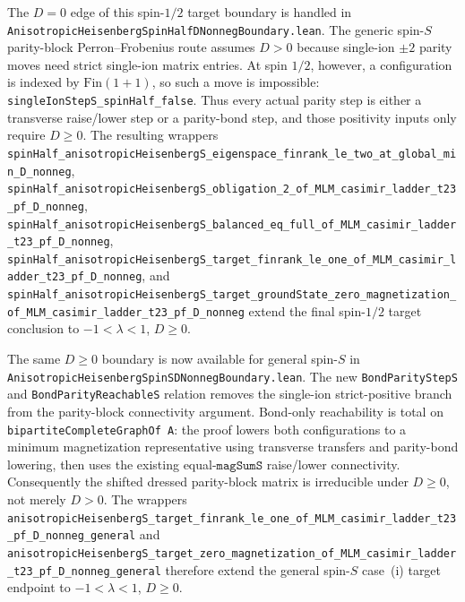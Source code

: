 \documentclass[a4paper,11pt]{article}
\begin{document}
The \(D=0\) edge of this spin-\(1/2\) target boundary is handled in
\texttt{AnisotropicHeisenbergSpinHalfDNonnegBoundary.lean}.  The generic
spin-\(S\) parity-block Perron--Frobenius route assumes \(D>0\) because
single-ion \(\pm2\) parity moves need strict single-ion matrix entries.  At
spin \(1/2\), however, a configuration is indexed by
\(\mathrm{Fin}(1+1)\), so such a move is impossible:
\texttt{singleIonStepS\_spinHalf\_false}.  Thus every actual parity step is
either a transverse raise/lower step or a parity-bond step, and those
positivity inputs only require \(D\ge0\).  The resulting wrappers
\texttt{spinHalf\_anisotropicHeisenbergS\_eigenspace\_finrank\_le\_two\_at\_global\_min\_D\_nonneg},
\texttt{spinHalf\_anisotropicHeisenbergS\_obligation\_2\_of\_MLM\_casimir\_ladder\_t23\_pf\_D\_nonneg},
\texttt{spinHalf\_anisotropicHeisenbergS\_balanced\_eq\_full\_of\_MLM\_casimir\_ladder\_t23\_pf\_D\_nonneg},
\texttt{spinHalf\_anisotropicHeisenbergS\_target\_finrank\_le\_one\_of\_MLM\_casimir\_ladder\_t23\_pf\_D\_nonneg},
and
\texttt{spinHalf\_anisotropicHeisenbergS\_target\_groundState\_zero\_magnetization\_of\_MLM\_casimir\_ladder\_t23\_pf\_D\_nonneg}
extend the final spin-\(1/2\) target conclusion to
\(-1<\lambda<1\), \(D\ge0\).

The same \(D\ge0\) boundary is now available for general spin-\(S\) in
\texttt{AnisotropicHeisenbergSpinSDNonnegBoundary.lean}.  The new
\texttt{BondParityStepS} and \texttt{BondParityReachableS} relation removes
the single-ion strict-positive branch from the parity-block connectivity
argument.  Bond-only reachability is total on
\texttt{bipartiteCompleteGraphOf A}: the proof lowers both configurations to
a minimum magnetization representative using transverse transfers and
parity-bond lowering, then uses the existing equal-\(\texttt{magSumS}\)
raise/lower connectivity.  Consequently the shifted dressed parity-block
matrix is irreducible under \(D\ge0\), not merely \(D>0\).  The wrappers
\texttt{anisotropicHeisenbergS\_target\_finrank\_le\_one\_of\_MLM\_casimir\_ladder\_t23\_pf\_D\_nonneg\_general}
and
\texttt{anisotropicHeisenbergS\_target\_zero\_magnetization\_of\_MLM\_casimir\_ladder\_t23\_pf\_D\_nonneg\_general}
therefore extend the general spin-\(S\) case~(i) target endpoint to
\(-1<\lambda<1\), \(D\ge0\).
\end{document}
